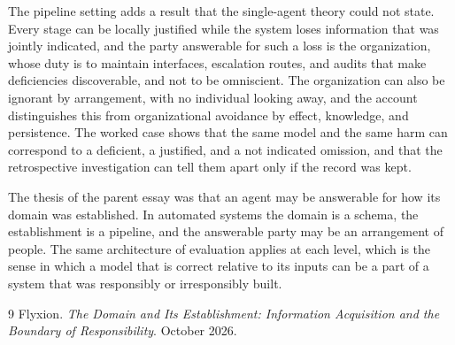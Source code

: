 \documentclass[11pt]{article}
\theoremstyle{plain}
\theoremstyle{definition}
\begin{document}
The pipeline setting adds a result that the single-agent theory could not state. Every stage can be locally justified while the system loses information that was jointly indicated, and the party answerable for such a loss is the organization, whose duty is to maintain interfaces, escalation routes, and audits that make deficiencies discoverable, and not to be omniscient. The organization can also be ignorant by arrangement, with no individual looking away, and the account distinguishes this from organizational avoidance by effect, knowledge, and persistence. The worked case shows that the same model and the same harm can correspond to a deficient, a justified, and a not indicated omission, and that the retrospective investigation can tell them apart only if the record was kept.

The thesis of the parent essay was that an agent may be answerable for how its domain was established. In automated systems the domain is a schema, the establishment is a pipeline, and the answerable party may be an arrangement of people. The same architecture of evaluation applies at each level, which is the sense in which a model that is correct relative to its inputs can be a part of a system that was responsibly or irresponsibly built.

\begin{thebibliography}{9}
 Flyxion. \emph{The Domain and Its Establishment: Information Acquisition and the Boundary of Responsibility}. October 2026.
\end{thebibliography}
\end{document}
